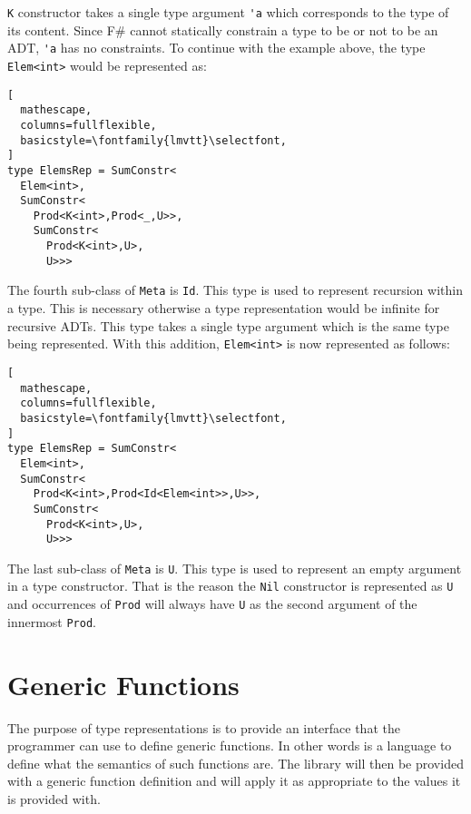 \documentclass{sigplanconf}
\begin{document}
\verb+K+ constructor takes a single type argument \verb+'a+ which
corresponds to the type of its content. Since F\# cannot statically
constrain a type to be or not to be an ADT, \verb+'a+ has no
constraints. To continue with the example above, the type
\verb+Elem<int>+ would be represented as:
\begin{lstlisting}[
  mathescape,
  columns=fullflexible,
  basicstyle=\fontfamily{lmvtt}\selectfont,
]
type ElemsRep = SumConstr<
  Elem<int>,
  SumConstr<
    Prod<K<int>,Prod<_,U>>,
    SumConstr<
      Prod<K<int>,U>,
      U>>>
\end{lstlisting}
The fourth sub-class of \verb+Meta+ is \verb+Id+. This type is used to
represent recursion within a type. This is necessary otherwise a type
representation would be infinite for recursive ADTs. This type takes a
single type argument which is the same type being
represented. With this addition, \verb+Elem<int>+ is now represented
as follows:
\begin{lstlisting}[
  mathescape,
  columns=fullflexible,
  basicstyle=\fontfamily{lmvtt}\selectfont,
]
type ElemsRep = SumConstr<
  Elem<int>,
  SumConstr<
    Prod<K<int>,Prod<Id<Elem<int>>,U>>,
    SumConstr<
      Prod<K<int>,U>,
      U>>>
\end{lstlisting}
The last sub-class of \verb+Meta+ is \verb+U+. This type is used to
represent an empty argument in a type constructor. That is the reason
the \verb+Nil+ constructor is represented as \verb+U+ and occurrences
of \verb+Prod+ will always have \verb+U+ as the second argument of the
innermost \verb+Prod+.
\section{Generic Functions}
The purpose of type representations is to provide an interface that
the programmer can use to define generic functions. In other words is
a language to define what the semantics of such functions are. The
library will then be provided with a generic function definition and
will apply it as appropriate to the values it is provided with.
\end{document}

